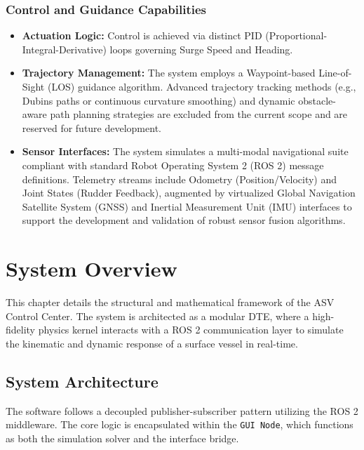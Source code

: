 \documentclass[12pt, a4paper, oneside]{report}
\begin{document}
\subsection{Control and Guidance Capabilities}
\begin{itemize}
    \item \textbf{Actuation Logic:} Control is achieved via distinct PID (Proportional-Integral-Derivative) loops governing Surge Speed and Heading.
    \item \textbf{Trajectory Management:} The system employs a Waypoint-based Line-of-Sight (LOS) guidance algorithm. Advanced trajectory tracking methods (e.g., Dubins paths or continuous curvature smoothing) and dynamic obstacle-aware path planning strategies are excluded from the current scope and are reserved for future development.
    \item \textbf{Sensor Interfaces:} The system simulates a multi-modal navigational suite compliant with standard Robot Operating System 2 (ROS 2) message definitions. Telemetry streams include Odometry (Position/Velocity) and Joint States (Rudder Feedback), augmented by virtualized Global Navigation Satellite System (GNSS) and Inertial Measurement Unit (IMU) interfaces to support the development and validation of robust sensor fusion algorithms.
\end{itemize}


\chapter{System Overview}
\label{ch:architecture}

This chapter details the structural and mathematical framework of the ASV Control Center. The system is architected as a modular DTE, where a high-fidelity physics kernel interacts with a ROS 2 communication layer to simulate the kinematic and dynamic response of a surface vessel in real-time.

\section{System Architecture}
The software follows a decoupled publisher-subscriber pattern utilizing the ROS 2 middleware. The core logic is encapsulated within the \texttt{GUI Node}, which functions as both the simulation solver and the interface bridge.
\end{document}
